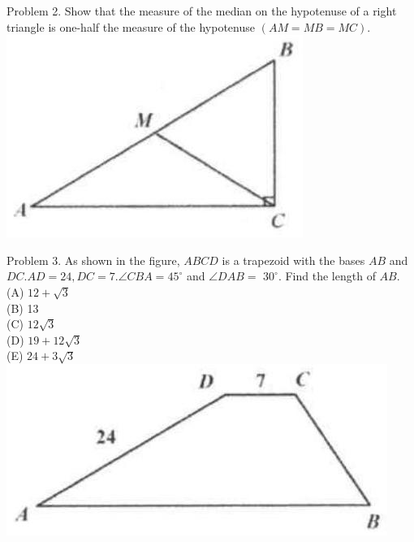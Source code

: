 \documentclass[10pt]{article}
\begin{document}
Problem 2. Show that the measure of the median on the hypotenuse of a right triangle is one-half the measure of the hypotenuse \((A M=M B=M C)\).\\
\includegraphics[max width=\textwidth, center]{2025_04_17_97bc1f7e44d93c271a88g-088(3)}

Problem 3. As shown in the figure, \(A B C D\) is a trapezoid with the bases \(A B\) and \(D C . A D=24, D C=7 . \angle C B A=45^{\circ}\) and \(\angle D A B=\) \(30^{\circ}\). Find the length of \(A B\).\\
(A) \(12+\sqrt{3}\)\\
(B) 13\\
(C) \(12 \sqrt{3}\)\\
(D) \(19+12 \sqrt{3}\)\\
(E) \(24+3 \sqrt{3}\)\\
\includegraphics[max width=\textwidth, center]{2025_04_17_97bc1f7e44d93c271a88g-088(1)}
\end{document}
